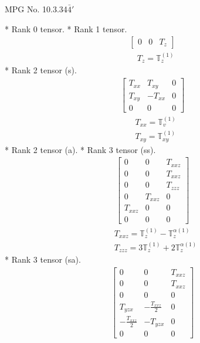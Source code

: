 \documentclass[fleqn,8pt,landscape]{jsarticle}
\begin{document}
\setcounter{MaxMatrixCols}{32}

\renewcommand{\tablename}{Table~}
\renewcommand{\figurename}{Figure~}
\begin{center}
\LARGE
MPG No. 10.3.34\quad$\bar{4}'$
\end{center}
* Rank 0 tensor.
* Rank 1 tensor.
\begin{align*}
\begin{bmatrix} 0 & 0 & T_{z} \end{bmatrix}
\end{align*}
\begin{align*}
& T_{z} = \mathbb{T}_{z}^{(1)}
\end{align*}
* Rank 2 tensor (s).
\begin{align*}
\begin{bmatrix} T_{xx} & T_{xy} & 0 \\ T_{xy} & - T_{xx} & 0 \\ 0 & 0 & 0 \end{bmatrix}
\end{align*}
\begin{align*}
& T_{xx} = \mathbb{T}_{v}^{(1)} \\
& T_{xy} = \mathbb{T}_{xy}^{(1)}
\end{align*}
* Rank 2 tensor (a).
* Rank 3 tensor (ss).
\begin{align*}
\begin{bmatrix} 0 & 0 & T_{xxz} \\ 0 & 0 & T_{xxz} \\ 0 & 0 & T_{zzz} \\ 0 & T_{xxz} & 0 \\ T_{xxz} & 0 & 0 \\ 0 & 0 & 0 \end{bmatrix}
\end{align*}
\begin{align*}
& T_{xxz} = \mathbb{T}_{z}^{(1)} - \mathbb{T}_{z}^{\alpha(1)} \\
& T_{zzz} = 3 \mathbb{T}_{z}^{(1)} + 2 \mathbb{T}_{z}^{\alpha(1)}
\end{align*}
* Rank 3 tensor (sa).
\begin{align*}
\begin{bmatrix} 0 & 0 & T_{xxz} \\ 0 & 0 & T_{xxz} \\ 0 & 0 & 0 \\ T_{yzx} & - \frac{T_{xxz}}{2} & 0 \\ - \frac{T_{xxz}}{2} & - T_{yzx} & 0 \\ 0 & 0 & 0 \end{bmatrix}
\end{align*}
\end{document}
